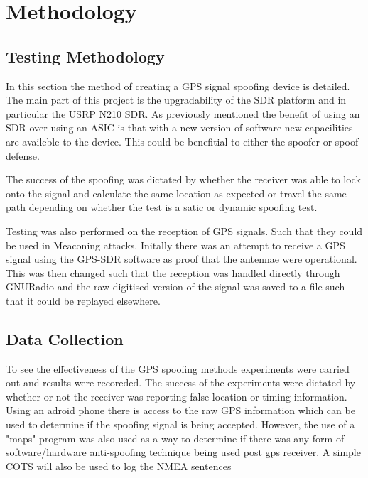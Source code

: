 \chapter{Methodology} %

\label{Chapter4} %


\section{Testing Methodology}

In this section the method of creating a GPS signal spoofing device is detailed. The main part of this project is the upgradability of the SDR platform
and in particular the USRP N210 SDR. As previously mentioned the benefit of using an SDR over using an ASIC is that with a new version of software 
new capacilities are availeble to the device. This could be benefitial to either the spoofer or spoof defense. 

The success of the spoofing was dictated by whether the receiver was able to lock onto the signal and calculate the same location as expected or travel the same path
depending on whether the test is a satic or dynamic spoofing test. 

Testing was also performed on the reception of GPS signals. Such that they could be used in Meaconing attacks. Initally there was an attempt to receive a GPS signal using
the GPS-SDR software as proof that the antennae were operational. This was then changed such that the reception was handled directly through GNURadio and the raw
digitised version of the signal was saved to a file such that it could be replayed elsewhere.

\section{Data Collection}

To see the effectiveness of the GPS spoofing methods experiments were carried out and results were recoreded. The success of the experiments were dictated by whether or
not the receiver was reporting false location or timing information. Using an adroid phone there is access to the raw GPS information which can be used to determine if
the spoofing signal is being accepted. However, the use of a "maps" program was also used as a way to determine if there was any form of software/hardware anti-spoofing
technique being used post gps receiver. A simple COTS will also be used to log the NMEA sentences 

